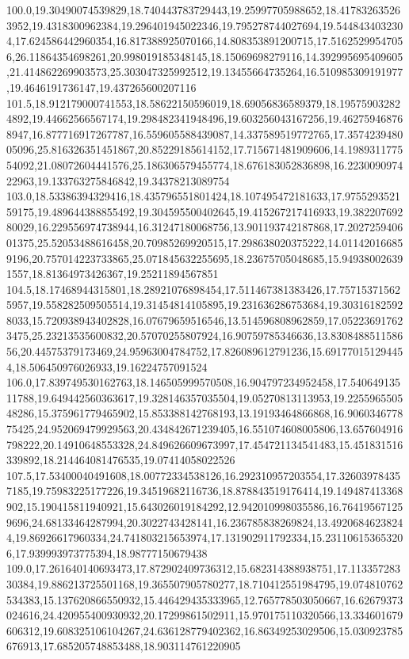 \documentclass[handout,10pt,t,aspectratio=169]{beamer}
\begin{document}
{100.0,19.30490074539829,18.740443783729443,19.25997705988652,18.417832635263952,19.4318300962384,19.296401945022346,19.795278744027694,19.5448434032304,17.624586442960354,16.817388925070166,14.808353891200715,17.51625299547056,26.11864354698261,20.998019185348145,18.15069698279116,14.392995695409605,21.414862269903573,25.303047325992512,19.13455664735264,16.510985309191977,19.4646191736147,19.437265600207116
101.5,18.912179000741553,18.58622150596019,18.69056836589379,18.195759032824892,19.44662566567174,19.298482341948496,19.603256043167256,19.462759468768947,16.877716917267787,16.559605588439087,14.337589519772765,17.357423948005096,25.816326351451867,20.85229185614152,17.715671481909606,14.198931177554092,21.08072604441576,25.186306579455774,18.676183052836898,16.223009097422963,19.133763275846842,19.34378213089754
103.0,18.53386394329416,18.435796551801424,18.107495472181633,17.975529352159175,19.489644388855492,19.304595500402645,19.415267217416933,19.38220769280029,16.229556974738944,16.31247180068756,13.901193742187868,17.202725940601375,25.52053488616458,20.70985269920515,17.298638020375222,14.011420166859196,20.757014223733865,25.071845632255695,18.23675705048685,15.949380026391557,18.81364973426367,19.25211894567851
104.5,18.17468944315801,18.28921076898454,17.511467381383426,17.757153715625957,19.558282509505514,19.31454814105895,19.231636286753684,19.303161825928033,15.720938943402828,16.07679659516546,13.514596808962859,17.052236917623475,25.23213535600832,20.57070255807924,16.90759785346636,13.830848851158656,20.44575379173469,24.95963004784752,17.826089612791236,15.691770151294454,18.506450976026933,19.16224757091524
106.0,17.839749530162763,18.146505999570508,16.904797234952458,17.54064913511788,19.649442560363617,19.328146357035504,19.05270813113953,19.225596550548286,15.375961779465902,15.853388142768193,13.19193464866868,16.906034677875425,24.952069479929563,20.434842671239405,16.551074608005806,13.657604916798222,20.14910648553328,24.849626609673997,17.454721134541483,15.451831516339892,18.214464081476535,19.07414058022526
107.5,17.53400040491608,18.00772334538126,16.292310957203554,17.326039784357185,19.75983225177226,19.34519682116736,18.878843519176414,19.149487413368902,15.190415811940921,15.643026019184292,12.942010998035586,16.764195671259696,24.68133464287994,20.3022743428141,16.236785838269824,13.49206846238244,19.86926617960334,24.741803215653974,17.131902911792334,15.231106153653206,17.939993973775394,18.98777150679438
109.0,17.261640140693473,17.872902409736312,15.682314388938751,17.11335728330384,19.886213725501168,19.365507905780277,18.710412551984795,19.074810762534383,15.137620866550932,15.446429435333965,12.765778503050667,16.62679373024616,24.420955400930932,20.17299861502911,15.970175110320566,13.334601679606312,19.608325106104267,24.636128779402362,16.86349253029506,15.030923785676913,17.685205748853488,18.903114761220905
}
\end{document}
